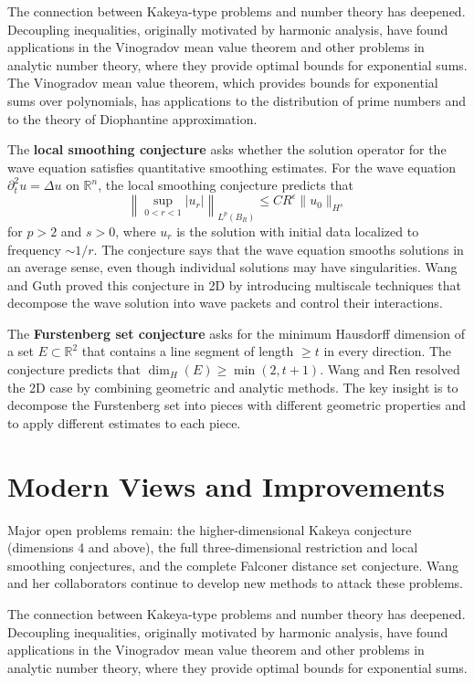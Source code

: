 The connection between Kakeya-type problems and number theory has deepened. Decoupling inequalities, originally motivated by harmonic analysis, have found applications in the Vinogradov mean value theorem and other problems in analytic number theory, where they provide optimal bounds for exponential sums. The Vinogradov mean value theorem, which provides bounds for exponential sums over polynomials, has applications to the distribution of prime numbers and to the theory of Diophantine approximation.

The \textbf{local smoothing conjecture} asks whether the solution operator for the wave equation satisfies quantitative smoothing estimates. For the wave equation $\partial_t^2 u = \Delta u$ on $\mathbb{R}^n$, the local smoothing conjecture predicts that
\[
\left\| \sup_{0 < r < 1} |u_r| \right\|_{L^p(B_R)} \le C R^\epsilon \|u_0\|_{H^{s}}
\]
for $p > 2$ and $s > 0$, where $u_r$ is the solution with initial data localized to frequency $\sim 1/r$. The conjecture says that the wave equation smooths solutions in an average sense, even though individual solutions may have singularities. Wang and Guth proved this conjecture in 2D by introducing multiscale techniques that decompose the wave solution into wave packets and control their interactions.

The \textbf{Furstenberg set conjecture} asks for the minimum Hausdorff dimension of a set $E \subset \mathbb{R}^2$ that contains a line segment of length $\ge t$ in every direction. The conjecture predicts that $\dim_H(E) \ge \min(2, t+1)$. Wang and Ren resolved the 2D case by combining geometric and analytic methods. The key insight is to decompose the Furstenberg set into pieces with different geometric properties and to apply different estimates to each piece.

\section{Modern Views and Improvements}

Major open problems remain: the higher-dimensional Kakeya conjecture (dimensions 4 and above), the full three-dimensional restriction and local smoothing conjectures, and the complete Falconer distance set conjecture. Wang and her collaborators continue to develop new methods to attack these problems.

The connection between Kakeya-type problems and number theory has deepened. Decoupling inequalities, originally motivated by harmonic analysis, have found applications in the Vinogradov mean value theorem and other problems in analytic number theory, where they provide optimal bounds for exponential sums.

